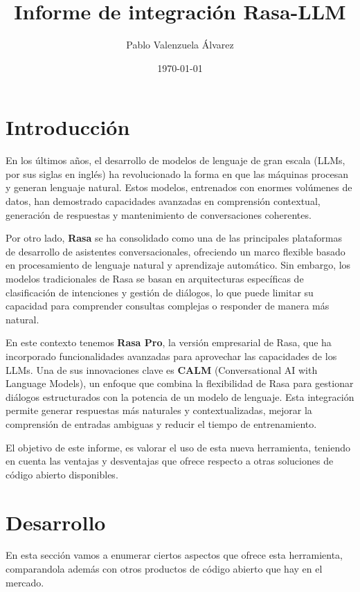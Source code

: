 \documentclass[a4paper,11pt]{article}
\title{Informe de integración Rasa-LLM}
\author{Pablo Valenzuela Álvarez}
\date{\today}
\begin{document}
	
	\maketitle
		
	\section{Introducción}
	
		En los últimos años, el desarrollo de modelos de lenguaje de gran escala (LLMs, por sus siglas en inglés) ha revolucionado la forma en que las máquinas procesan y generan lenguaje natural. Estos modelos, entrenados con enormes volúmenes de datos, han demostrado capacidades avanzadas en comprensión contextual, generación de respuestas y mantenimiento de conversaciones coherentes.  
		
		Por otro lado, \textbf{Rasa} se ha consolidado como una de las principales plataformas de desarrollo de asistentes conversacionales, ofreciendo un marco flexible basado en procesamiento de lenguaje natural y aprendizaje automático. Sin embargo, los modelos tradicionales de Rasa se basan en arquitecturas específicas de clasificación de intenciones y gestión de diálogos, lo que puede limitar su capacidad para comprender consultas complejas o responder de manera más natural.  
		
		En este contexto tenemos \textbf{Rasa Pro}, la versión empresarial de Rasa, que ha incorporado funcionalidades avanzadas para aprovechar las capacidades de los LLMs. Una de sus innovaciones clave es \textbf{CALM} (Conversational AI with Language Models), un enfoque que combina la flexibilidad de Rasa para gestionar diálogos estructurados con la potencia de un modelo de lenguaje. Esta integración permite generar respuestas más naturales y contextualizadas, mejorar la comprensión de entradas ambiguas y reducir el tiempo de entrenamiento.
		
		El objetivo de este informe, es valorar el uso de esta nueva herramienta, teniendo en cuenta las ventajas y desventajas que ofrece respecto a otras soluciones de código abierto disponibles.
		
	\section{Desarrollo}
	
		En esta sección vamos a enumerar ciertos aspectos que ofrece esta herramienta, comparandola además con otros productos de código abierto que hay en el mercado.			
			
\end{document}
